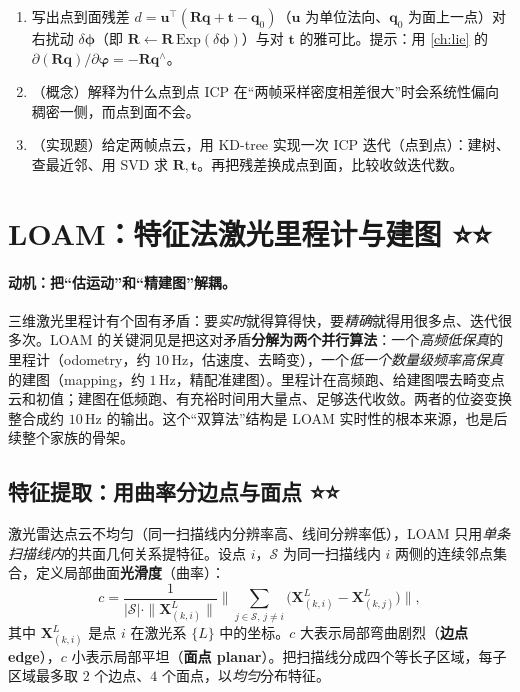 \begin{practice}
\begin{enumerate}
  \item 写出点到面残差 $d=\mathbf{u}^\top(\mathbf{R}\mathbf{q}+\mathbf{t}-\mathbf{q}_0)$（$\mathbf{u}$ 为单位法向、$\mathbf{q}_0$ 为面上一点）对右扰动 $\delta\boldsymbol{\phi}$（即 $\mathbf{R}\leftarrow\mathbf{R}\,\mathrm{Exp}(\delta\boldsymbol{\phi})$）与对 $\mathbf{t}$ 的雅可比。提示：用 \cref{ch:lie} 的 $\partial(\mathbf{R}\mathbf{q})/\partial\boldsymbol{\varphi}=-\mathbf{R}\mathbf{q}^\wedge$。
  \item （概念）解释为什么点到点 ICP 在“两帧采样密度相差很大”时会系统性偏向稠密一侧，而点到面不会。
  \item （实现题）给定两帧点云，用 KD-tree 实现一次 ICP 迭代（点到点）：建树、查最近邻、用 SVD 求 $\mathbf{R},\mathbf{t}$。再把残差换成点到面，比较收敛迭代数。
\end{enumerate}
\end{practice}

\section{LOAM：特征法激光里程计与建图 ⭐⭐}
\label{sec:lidar-loam}

\paragraph{动机：把“估运动”和“精建图”解耦。}
三维激光里程计有个固有矛盾：要\emph{实时}就得算得快，要\emph{精确}就得用很多点、迭代很多次。LOAM\cite{zhang2014loam} 的关键洞见是把这对矛盾\textbf{分解为两个并行算法}：一个\emph{高频低保真}的里程计（odometry，约 $10$\,Hz，估速度、去畸变），一个\emph{低一个数量级频率高保真}的建图（mapping，约 $1$\,Hz，精配准建图）。里程计在高频跑、给建图喂去畸变点云和初值；建图在低频跑、有充裕时间用大量点、足够迭代收敛。两者的位姿变换整合成约 $10$\,Hz 的输出。这个“双算法”结构是 LOAM 实时性的根本来源，也是后续整个家族的骨架。

\subsection{特征提取：用曲率分边点与面点 ⭐⭐}
\label{sec:lidar-loam-feat}

激光雷达点云不均匀（同一扫描线内分辨率高、线间分辨率低），LOAM 只用\emph{单条扫描线内}的共面几何关系提特征。设点 $i$，$\mathcal{S}$ 为同一扫描线内 $i$ 两侧的连续邻点集合，定义局部曲面\textbf{光滑度}（曲率）\cite{zhang2014loam}：
\begin{equation}
  c=\frac{1}{|\mathcal{S}|\cdot\|\mathbf{X}^L_{(k,i)}\|}\bigg\|\sum_{j\in\mathcal{S},\,j\neq i}\big(\mathbf{X}^L_{(k,i)}-\mathbf{X}^L_{(k,j)}\big)\bigg\|,
  \label{eq:lidar-loam-c}
\end{equation}
其中 $\mathbf{X}^L_{(k,i)}$ 是点 $i$ 在激光系 $\{L\}$ 中的坐标。$c$ 大表示局部弯曲剧烈（\textbf{边点 edge}），$c$ 小表示局部平坦（\textbf{面点 planar}）。把扫描线分成四个等长子区域，每子区域最多取 $2$ 个边点、$4$ 个面点，以\emph{均匀}分布特征。

